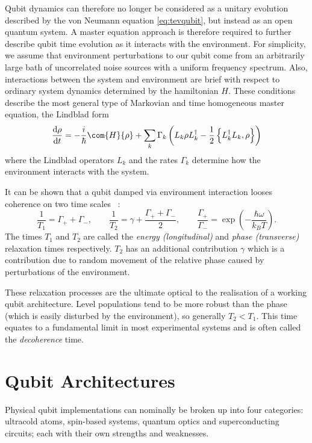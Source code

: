 Qubit dynamics can therefore no longer be considered as a unitary evolution described by the von Neumann equation \cref{eq:tevqubit}, but instead as an open quantum system.
A master equation approach is therefore required to further describe qubit time evolution as it interacts with the environment.
For simplicity, we assume that environment perturbations to our qubit come from an arbitrarily large bath of uncorrelated noise sources with a uniform frequency spectrum.
Also, interactions between the system and environment are brief with respect to ordinary system dynamics determined by the hamiltonian $H$.
These conditions describe the most general type of Markovian and time homogeneous master equation, the Lindblad form~\cite{Lindblad1976}
\begin{equation}
\frac{\mathrm{d}\rho}{\mathrm{d}t} =-\frac{i}{\hbar}\com{H}{\rho}+\sum_{k} \Gamma_k\left(L_k\rho L_k^\dagger-\frac{1}{2}\left\{L_k^\dagger L_k, \rho\right\}\right)
\label{eq:lindblad}
\end{equation}
where the Lindblad operators $L_k$ and the rates $\Gamma_k$ determine
how the environment interacts with the system.

It can be shown that a qubit damped via environment interaction looses coherence on two time scales ~\cite{Stenholm2005}:
\begin{equation}
\frac{1}{T_1} = \Gamma_+ + \Gamma_-, \qquad \frac{1}{T_2} = \gamma + \frac{\Gamma_+ + \Gamma_-}{2}, \qquad \frac{\Gamma_+}{\Gamma_-} = \exp\left(-\frac{\hbar \omega}{k_B T}\right).
\label{eq:t1t2}
\end{equation}
The times $T_1$ and $T_2$ are called the \textit{energy (longitudinal)} and \textit{phase (transverse)} relaxation times respectively.
$T_2$ has an additional contribution $\gamma$ which is a contribution due to random movement of the relative phase caused by perturbations of the environment.

These relaxation processes are the ultimate optical to the realisation of a working qubit architecture.
Level populations tend to be more robust than the phase (which is easily disturbed by the environment), so generally $T_2 < T_1$.
This time equates to a fundamental limit in most experimental systems and is often called the \textit{decoherence} time.

\section{Qubit Architectures}
Physical qubit implementations can nominally be broken up into four categories: ultracold atoms, spin-based systems, quantum optics and superconducting circuits; each with their own strengths and weaknesses.


